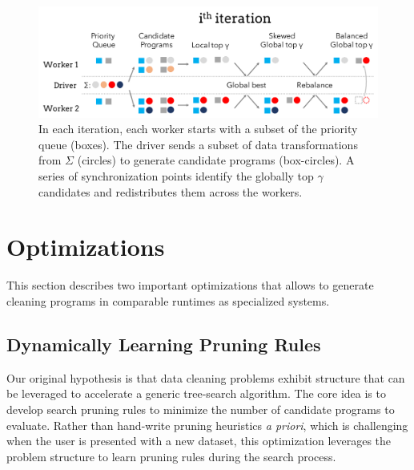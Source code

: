 \begin{figure}[t]
    \centering
    \includegraphics[width=\columnwidth]{figures/distributed.pdf}
    \caption{In each iteration, each worker starts with a subset of the priority queue (boxes).  The driver sends a subset of data transformations from $\Sigma$ (circles) to generate candidate programs (box-circles).  A series of synchronization points identify the globally top $\gamma$ candidates and redistributes them across the workers.   \label{fig:algo}}
\end{figure}


\section{Optimizations}\label{s:opts}
This section describes two important optimizations that allows \sys to generate cleaning programs in comparable runtimes as specialized systems.

\subsection{Dynamically Learning Pruning Rules}\label{s:dynlearn}
Our original hypothesis is that data cleaning problems exhibit structure that can be leveraged to accelerate a generic tree-search algorithm.   The core idea is to develop search pruning rules to minimize the number of candidate programs to evaluate.  Rather than hand-write pruning heuristics {\it a priori}, which is challenging when the user is presented with a new dataset, this optimization leverages the problem structure to learn pruning rules during the search process.



